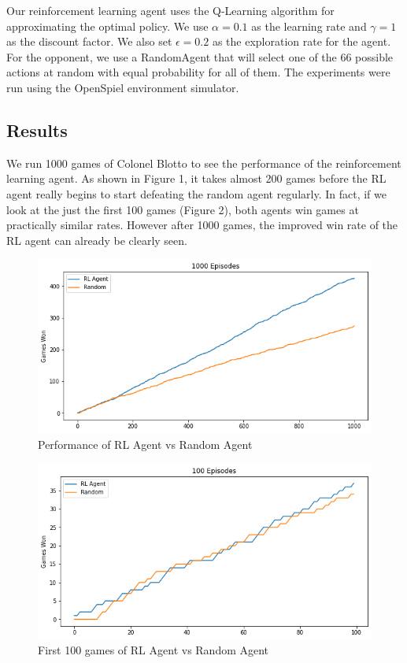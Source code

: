 \documentclass[11pt, oneside]{article}   	%
\begin{document}
\hfill

Our reinforcement learning agent uses the Q-Learning algorithm for approximating the optimal policy. We use $\alpha=0.1$ as the learning rate and $\gamma=1$ as the discount factor. We also set $\epsilon=0.2$ as the exploration rate for the agent. For the opponent, we use a RandomAgent that will select one of the 66 possible actions at random with equal probability for all of them. The experiments were run using the OpenSpiel\cite{OpenSpiel} environment simulator.


\subsection{Results}

We run 1000 games of Colonel Blotto to see the performance of the reinforcement learning agent. As shown in Figure 1, it takes almost 200 games before the RL agent really begins to start defeating the random agent regularly. In fact, if we look at the just the first 100 games (Figure 2), both agents win games at practically similar rates. However after 1000 games, the improved win rate of the RL agent can already be clearly seen.

\begin{figure}[h]
    \centering
    \includegraphics[scale=0.5]{./images/rl_random.png}
    \caption{Performance of RL Agent vs Random Agent}
    \label{fig:mesh1}
\end{figure}

\begin{figure}[h]
    \centering
    \includegraphics[scale=0.5]{./images/rl_random100.png}
    \caption{First 100 games of RL Agent vs Random Agent}
    \label{fig:mesh1}
\end{figure}
\end{document}
